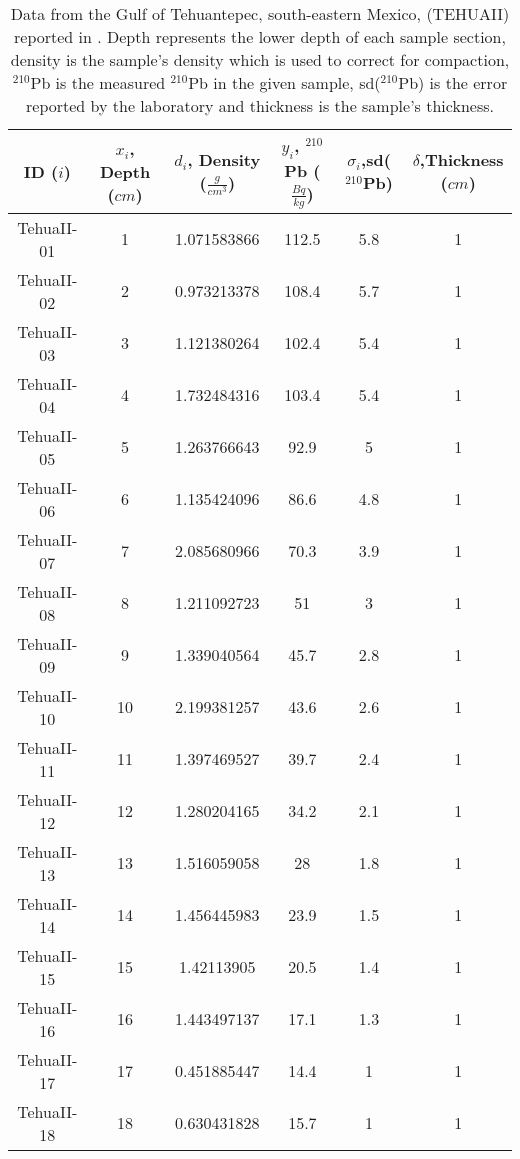 \documentclass [10pt] {article}
\begin{document}
\begin{table}[h!]
\centering
    \begin{tabular}{|c| c| c| c| c| c|}
\hline
	    ID ($i$) & $x_i$, Depth ($cm$)  & $d_i$, Density ($\frac{g}{cm^3}$)  & $y_i$, $^{210}$Pb ($\frac{Bq}{kg}$) & $\sigma_i$,sd($^{210}$Pb)  & $\delta$,Thickness ($cm$)   \\
\hline
TehuaII-01  & 1  & 1.071583866  & 112.5  & 5.8  & 1\\
TehuaII-02  & 2  & 0.973213378  & 108.4  & 5.7  & 1\\
TehuaII-03  & 3  & 1.121380264  & 102.4  & 5.4  & 1\\
TehuaII-04  & 4  & 1.732484316  & 103.4  & 5.4  & 1\\
TehuaII-05  & 5  & 1.263766643  & 92.9  & 5  & 1\\
TehuaII-06  & 6  & 1.135424096  & 86.6  & 4.8  & 1\\
TehuaII-07  & 7  & 2.085680966  & 70.3  & 3.9  & 1\\
TehuaII-08  & 8  & 1.211092723  & 51  & 3  & 1\\
TehuaII-09  & 9  & 1.339040564  & 45.7  & 2.8  & 1\\
TehuaII-10  & 10  & 2.199381257  & 43.6  & 2.6  & 1\\
TehuaII-11  & 11  & 1.397469527  & 39.7  & 2.4  & 1\\
TehuaII-12  & 12  & 1.280204165  & 34.2  & 2.1  & 1\\
TehuaII-13  & 13  & 1.516059058  & 28  & 1.8  & 1\\
TehuaII-14  & 14  & 1.456445983  & 23.9  & 1.5  & 1\\
TehuaII-15  & 15  & 1.42113905  & 20.5  & 1.4  & 1\\
\hline
\dotfill
TehuaII-16  & 16  & 1.443497137  & 17.1  & 1.3  & 1\\
TehuaII-17  & 17  & 0.451885447  & 14.4  & 1  & 1\\
TehuaII-18  & 18  & 0.630431828  & 15.7  & 1  & 1\\
\hline
    \end{tabular}
	\caption{Data from the Gulf of Tehuantepec, south-eastern Mexico, (TEHUAII) reported in \citet{Sanchez-Cabeza2012}. Depth represents the lower depth of each sample section, density is the sample's density which is used to correct for compaction, $^{210}$Pb is the measured $^{210}$Pb in the given sample, sd($^{210}$Pb) is the error reported by the laboratory and thickness is the sample's thickness.  }
	\label{tab:tehuaii}
\end{table}
\end{document}
